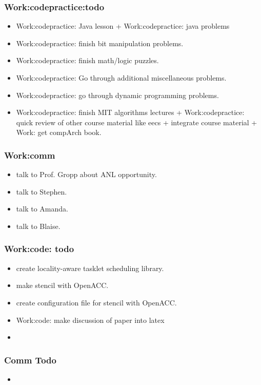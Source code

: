 \begin{frame} 
\frametitle{Work:codepractice:todo } 
\begin{itemize} 
\tiny \item \tiny Work:codepractice: Java lesson + Work:codepractice:
java problems  
\item \tiny Work:codepractice: finish bit manipulation problems. 
\item \tiny Work:codepractice: finish math/logic puzzles. 
\item \tiny Work:codepractice: Go through additional miscellaneous
  problems. 
\item \tiny Work:codepractice: go through dynamic programming
  problems. 
\item \tiny Work:codepractice: finish MIT algorithms lectures +
  Work:codepractice: quick review of other course material like eecs +
  integrate course material + Work: get compArch book.  
\end{itemize}
\end{frame}


\begin{frame}
\frametitle{Work:comm} 
\begin{itemize} 
\small \item \small talk to Prof. Gropp about ANL opportunity. 
\item \small talk to Stephen.
\item \small talk to Amanda. 
\item \small talk to Blaise. 
\end{itemize}
\end{frame} 

\begin{frame}
\frametitle{Work:code: todo} 
\begin{itemize}
\tiny \item \tiny create locality-aware tasklet scheduling library. 
\item \tiny make stencil with OpenACC. 
\item \tiny create configuration file for stencil with OpenACC. 
\item \tiny Work:code: make discussion of paper into latex 
\item \tiny 
\end{itemize} 
\end{frame}  

\begin{frame}
\frametitle{Comm Todo} 
\begin{itemize} 
\item \tiny  
\end{itemize} 
\end{frame}
 
